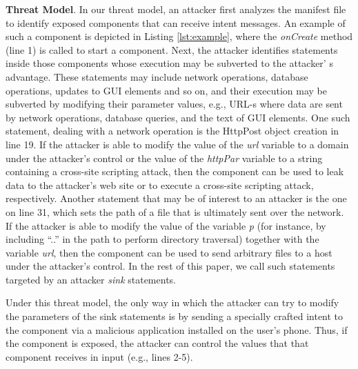 \textbf{Threat Model}. In our threat model, an attacker first analyzes the manifest file to identify exposed components that can receive intent messages. An example of such a component is depicted in Listing \ref{lst:example}, where the \textit{onCreate} method (line 1) is called to start a component. Next, the attacker identifies statements inside those components whose execution may be subverted to the attacker' s advantage. These statements may include network operations, database operations, updates to GUI elements and so on, and their execution may be subverted by modifying their parameter values, e.g., URL-s where data are sent by network operations, database queries, and the text of GUI elements. One such statement, dealing with a network operation is the HttpPost object creation in line 19. If the attacker is able to modify the value of the \textit{url} variable to a domain under the attacker's control or the value of the \textit{httpPar} variable to a string containing a cross-site scripting attack, then the component can be used to leak data to the attacker's web site or to execute a cross-site scripting attack, respectively. Another statement that may be of interest to an attacker is the one on line 31, which sets the path of a file that is ultimately sent over the network. If the attacker is able to modify the value of the variable \textit{p} (for instance, by including ``..'' in the path to perform directory traversal) together with the variable \textit{url}, then the component can be used to send arbitrary files to a host under the attacker's control. 
In the rest of this paper, we call such statements targeted by an attacker \textit{sink} statements.

Under this threat model, the only way in which the attacker can try to modify the parameters of the sink statements is by sending a specially crafted intent to the component via a malicious application installed on the user's phone. Thus, if the component is exposed, the attacker can control the values that that component receives in input (e.g., lines 2-5).

